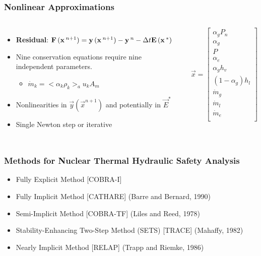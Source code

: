 \documentclass[compress,xcolor=table]{beamer}
\begin{document}
\begin{frame}
\frametitle{Nonlinear Approximations}

\begin{columns}
\begin{itemize}
\item{\textbf{Residual}: $\vec{F}(\vec{x}^{n+1}) = \vec{y}(\vec{x}^{n+1}) - \vec{y}^{n} - \dt{} \vec{E}(\vec{x}^{*})$}
\item{Nine conservation equations require nine independent parameters.
\begin{itemize}
\item{$ \dot{m}_{k} = <\alpha_k \rho_k>_{a} u_{k} A_{m}$}
\end{itemize}
}
\item{Nonlinearities in $\vec{y}(\vec{x}^{n+1})$ and potentially in $\vec{E}^{*}$}
\item{Single Newton step or iterative}
\end{itemize}

\begin{equation*}
\label{eqn:independent_variables}
\vec{x} = \begin{bmatrix}
\alpha_{g}P_{n}    \\
\alpha_g           \\
P                  \\
\alpha_e           \\
\alpha_g h_v       \\
(1 - \alpha_g) h_l \\
\dot{m}_g          \\
\dot{m}_l          \\
\dot{m}_e          \\
\end{bmatrix}
\end{equation*}
\end{columns}

\end{frame}
\begin{frame}
\frametitle{Methods for Nuclear Thermal Hydraulic Safety Analysis}

\begin{itemize}
\item{Fully Explicit Method [COBRA-I]}
\item{Fully Implicit Method [CATHARE] (Barre and Bernard, 1990)}
\item{Semi-Implicit Method [COBRA-TF] (Liles and Reed, 1978) }
\item{Stability-Enhancing Two-Step Method (SETS) [TRACE] (Mahaffy, 1982) }
\item{Nearly Implicit Method [RELAP] (Trapp and Riemke, 1986) }
\end{itemize}

\end{frame}
\end{document}
